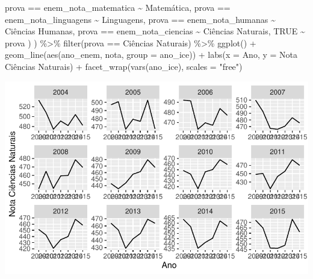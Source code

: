 \documentclass[
  letterpaper,
  DIV=11,
  numbers=noendperiod]{scrartcl}
\newenvironment{Shaded}{\begin{snugshade}}{\end{snugshade}}
\newcommand{\AttributeTok}[1]{\textcolor[rgb]{0.40,0.45,0.13}{#1}}
\newcommand{\ConstantTok}[1]{\textcolor[rgb]{0.56,0.35,0.01}{#1}}
\newcommand{\FunctionTok}[1]{\textcolor[rgb]{0.28,0.35,0.67}{#1}}
\newcommand{\NormalTok}[1]{\textcolor[rgb]{0.00,0.23,0.31}{#1}}
\newcommand{\SpecialCharTok}[1]{\textcolor[rgb]{0.37,0.37,0.37}{#1}}
\newcommand{\StringTok}[1]{\textcolor[rgb]{0.13,0.47,0.30}{#1}}
\begin{document}
\begin{Shaded}
\begin{Highlighting}[]
\NormalTok{      prova }\SpecialCharTok{==} \StringTok{\textquotesingle{}enem\_nota\_matematica\textquotesingle{}} \SpecialCharTok{\textasciitilde{}} \StringTok{\textquotesingle{}Matemática\textquotesingle{}}\NormalTok{,}
\NormalTok{      prova }\SpecialCharTok{==} \StringTok{\textquotesingle{}enem\_nota\_linguagens\textquotesingle{}} \SpecialCharTok{\textasciitilde{}} \StringTok{\textquotesingle{}Linguagens\textquotesingle{}}\NormalTok{,}
\NormalTok{      prova }\SpecialCharTok{==} \StringTok{\textquotesingle{}enem\_nota\_humanas\textquotesingle{}} \SpecialCharTok{\textasciitilde{}} \StringTok{\textquotesingle{}Ciências Humanas\textquotesingle{}}\NormalTok{,}
\NormalTok{      prova }\SpecialCharTok{==} \StringTok{\textquotesingle{}enem\_nota\_ciencias\textquotesingle{}} \SpecialCharTok{\textasciitilde{}} \StringTok{\textquotesingle{}Ciências Naturais\textquotesingle{}}\NormalTok{,}
      \ConstantTok{TRUE} \SpecialCharTok{\textasciitilde{}}\NormalTok{ prova}
\NormalTok{    )}
\NormalTok{  ) }\SpecialCharTok{\%\textgreater{}\%}
  \FunctionTok{filter}\NormalTok{(prova }\SpecialCharTok{==} \StringTok{\textquotesingle{}Ciências Naturais\textquotesingle{}}\NormalTok{) }\SpecialCharTok{\%\textgreater{}\%} 
  \FunctionTok{ggplot}\NormalTok{() }\SpecialCharTok{+}
  \FunctionTok{geom\_line}\NormalTok{(}\FunctionTok{aes}\NormalTok{(ano\_enem, nota, }\AttributeTok{group =}\NormalTok{ ano\_ice)) }\SpecialCharTok{+}
  \FunctionTok{labs}\NormalTok{(}\AttributeTok{x =} \StringTok{\textquotesingle{}Ano\textquotesingle{}}\NormalTok{, }\AttributeTok{y =} \StringTok{\textquotesingle{}Nota Ciências Naturais\textquotesingle{}}\NormalTok{) }\SpecialCharTok{+}
  \FunctionTok{facet\_wrap}\NormalTok{(}\FunctionTok{vars}\NormalTok{(ano\_ice), }\AttributeTok{scales =} \StringTok{"free"}\NormalTok{)}
\end{Highlighting}
\end{Shaded}

\includegraphics{script_files/figure-latex/unnamed-chunk-11-6.pdf}
\end{document}
